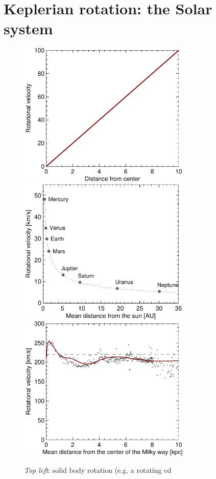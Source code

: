 \section{Keplerian rotation: the Solar system} 
\begin{figure}[h]
\begin{center}
\includegraphics[width=8.2cm]{../figures/cdrot.pdf}
\includegraphics[width=8.2cm]{../figures/solsystrot.pdf}
\includegraphics[width=8.2cm]{../figures/mwrot.pdf}
\end{center}
\caption{\emph{Top left}: solid body rotation (e.g. a rotating cd
}
\end{figure}
